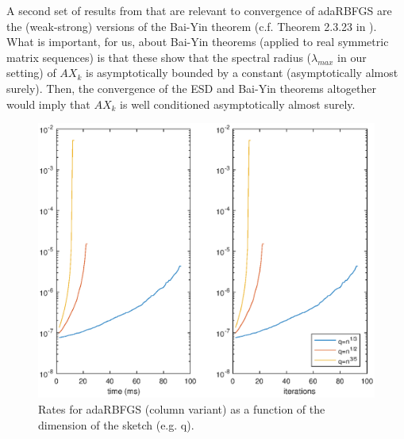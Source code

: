 \documentclass[12pt,conference,compsocconf]{IEEEtran}
\begin{document}
A second set of results from \cite{Tao} that are relevant to convergence of adaRBFGS are the (weak-strong) versions of the Bai-Yin theorem (c.f. Theorem 2.3.23 in \cite{Tao}). What is important, for us, about Bai-Yin theorems (applied to real symmetric matrix sequences) is that these show that the spectral radius ($\lambda_{max}$ in our setting) of $AX_k$ is asymptotically bounded by a constant (asymptotically almost surely). Then, the convergence of the ESD and Bai-Yin theorems altogether would imply that $AX_k$ is well conditioned asymptotically almost surely.

\begin{figure}[H]
  \centering
  \includegraphics[height=0.7\columnwidth,width=1.1\columnwidth]{ratedim.eps}
  
  \vspace{-2mm}
  \caption{Rates for adaRBFGS (column variant) as a function of the dimension of the sketch (e.g. q). \label{fig:ratedim}}  
  
\end{figure}
\end{document}
